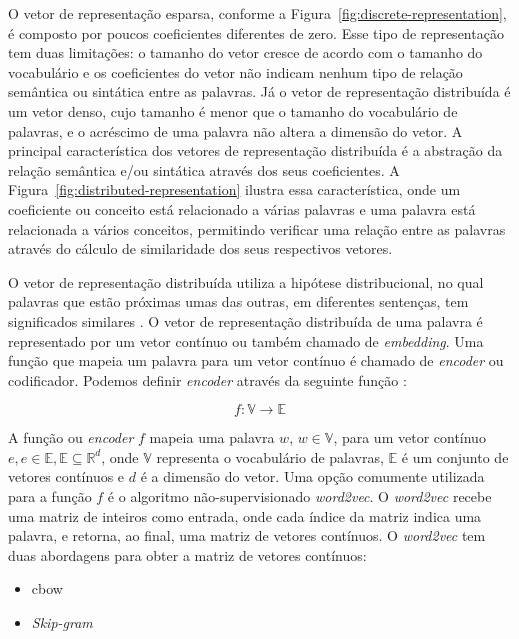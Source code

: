 O vetor de representação esparsa, conforme a Figura~\ref{fig:discrete-representation}, é composto por poucos coeficientes diferentes de zero. Esse tipo de representação tem duas limitações: o tamanho do vetor cresce de acordo com o tamanho do vocabulário e os coeficientes do vetor não indicam nenhum tipo de relação semântica ou sintática entre as palavras. Já o vetor de representação distribuída é um vetor denso, cujo tamanho é menor que o tamanho do vocabulário de palavras, e o acréscimo de uma palavra não altera a dimensão do vetor. A principal característica dos vetores de representação distribuída é a abstração da relação semântica e/ou sintática através dos seus coeficientes. A Figura~\ref{fig:distributed-representation} ilustra essa característica, onde um coeficiente ou conceito está relacionado a várias palavras e uma palavra está relacionada a vários conceitos, permitindo verificar uma relação entre as palavras através do cálculo de similaridade dos seus respectivos vetores.

 O vetor de representação distribuída utiliza a hipótese distribucional, no qual palavras que estão próximas umas das outras, em diferentes sentenças, tem significados similares \citep{Goodfellow-et-al-2016}. O vetor de representação distribuída de uma palavra é representado por um vetor contínuo ou também chamado de \textit{embedding}. Uma função que mapeia um palavra para um vetor contínuo é chamado de \textit{encoder} ou codificador. Podemos definir \textit{encoder} através da seguinte função \citep{cambronero-deep-learning-code-search:2019}:

\begin{equation}
    f: \mathbb{V} \rightarrow \mathbb{E}
\end{equation}

A função ou \textit{encoder} $f$ mapeia uma palavra $w$, $w \in \mathbb{V}$, para um vetor contínuo $e, e \in \mathbb{E}, \mathbb{E }\subseteq \mathbb{R}^{d}$, onde $\mathbb{V}$ representa o vocabulário de palavras, $\mathbb{E}$ é um conjunto de vetores contínuos e $d$ é a dimensão do vetor. Uma opção comumente utilizada para a função $f$ é o algoritmo não-supervisionado \textit{word2vec}. O \textit{word2vec} recebe uma matriz de inteiros como entrada, onde cada índice da matriz indica uma palavra, e retorna, ao final, uma matriz de vetores contínuos. O \textit{word2vec} tem duas abordagens para obter a matriz de vetores contínuos:

\begin{itemize}
    \item \acrfull{cbow}
    \item \textit{Skip-gram}
\end{itemize}
 
